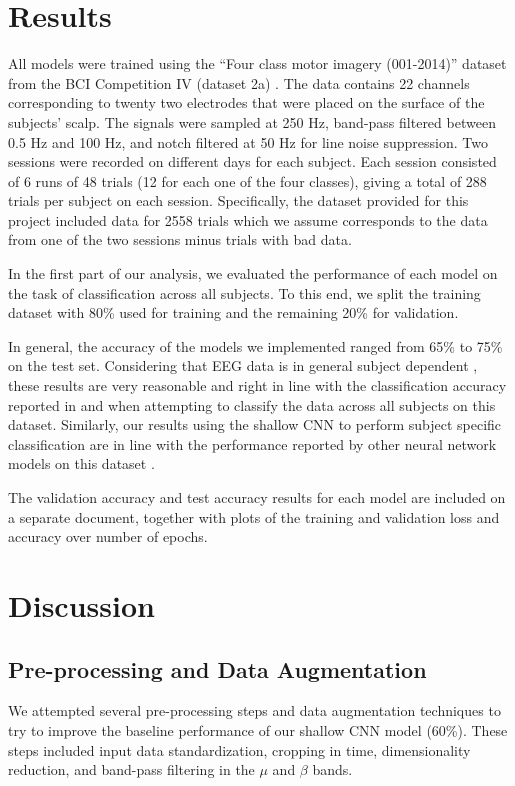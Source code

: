 \documentclass[10pt,twocolumn,letterpaper]{article}
\begin{document}
\section{Results}
All models were trained using the ``Four class motor imagery (001-2014)''
dataset from the BCI Competition IV (dataset 2a) \cite{brunner2008bci}.
The data contains 22 channels corresponding to twenty two electrodes that were
placed on the surface of the subjects' scalp.
The signals were sampled at 250 Hz, band-pass filtered between 0.5 Hz and 100
Hz, and notch filtered at 50 Hz for line noise suppression.
Two sessions were recorded on different days for each subject. Each session
consisted of 6 runs of 48 trials (12 for each one of the four classes), giving a
total of 288 trials per subject on each session. Specifically, the dataset
provided for this project included data for 2558 trials which we assume
corresponds to the data from one of the two sessions minus trials with bad data.

In the first part of our analysis, we evaluated the performance of each model on
the task of classification across all subjects. To this end, we split the
training dataset with 80\% used for training and the remaining 20\% for
validation.

In general, the accuracy of the models we
implemented ranged from 65\% to 75\% on the test set. Considering that EEG data
is in general subject dependent \cite{wang}, these results are very reasonable
and right in line with the classification accuracy reported in
\cite{kostas2019machine} and \cite{DBLP} when attempting to classify the data
across all subjects on this dataset. Similarly, our results using the shallow
CNN to perform subject specific classification are in line with the performance
reported by other neural network models on this dataset \cite{wang}.

The validation accuracy and test accuracy results for each model are included
on a separate document, together with plots of the training and validation loss
and accuracy over number of epochs.

\section{Discussion}
\subsection{Pre-processing and Data Augmentation}
We attempted several pre-processing steps and data augmentation techniques to
try to improve the baseline performance of our shallow CNN model (60\%).
These steps included input data standardization, cropping in time,
dimensionality reduction, and band-pass filtering in the $\mu$ and $\beta$
bands.
\end{document}
